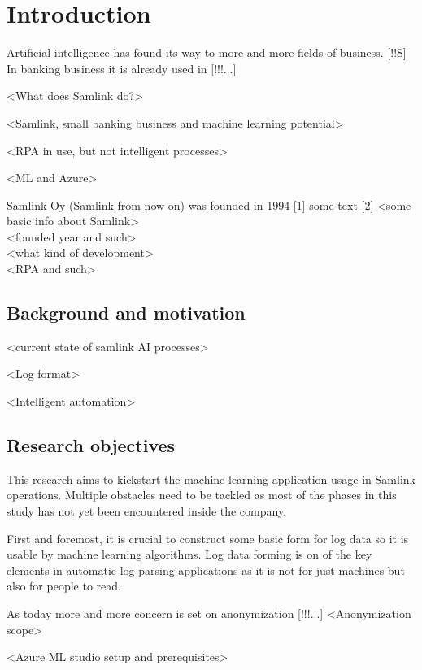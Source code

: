 \documentclass[english, 12pt, a4paper, elec, utf8, a-1b, online]{aaltothesis}
\begin{document}
\section{Introduction}

\thispagestyle{empty}

Artificial intelligence has found its way to more and more fields of business. [!!S]
In banking business it is already used in [!!!...]


<What does Samlink do?>

<Samlink, small banking business and machine learning potential>

<RPA in use, but not intelligent processes>

<ML and Azure>

Samlink Oy (Samlink from now on) was founded in 1994 [1]
some text [2]
<some basic info about Samlink> \\
<founded year and such> \\
<what kind of development> \\
<RPA and such> \\



\subsection{Background and motivation}
<current state of samlink AI processes>

<Log format>

<Intelligent automation>

\subsection{Research objectives}
This research aims to kickstart the machine learning application usage in Samlink operations.
Multiple obstacles need to be tackled
as most of the phases in this study has not yet been encountered inside the company.

First and foremost,
it is crucial to construct some basic form for log data
so it is usable by machine learning algorithms.
Log data forming is on of the key elements in automatic log parsing applications
as it is not for just machines
but also for people to read.

As today more and more concern is set on anonymization
[!!!...]
<Anonymization scope>

<Azure ML studio setup and prerequisites>
\end{document}
